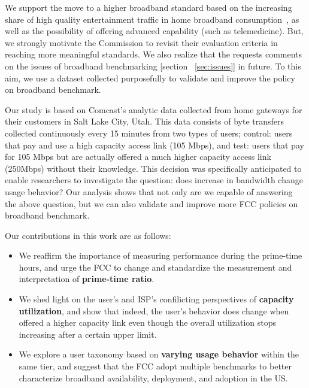 We support the move to a higher broadband standard based on the increasing 
share of high quality entertainment traffic in home broadband 
consumption~\cite{sandvine2014report1,sandvine2014report2}, as well as the 
possibility of offering advanced capability (such as telemedicine). But, we 
strongly motivate the Commission to revisit their evaluation criteria in 
reaching more meaningful standards. We also realize that the \FCC requests 
comments on the issues of broadband benchmarking [section ~\ref{sec:issues}] in 
future. To this aim, we use a dataset collected purposefully to validate and 
improve the \FCC policy on broadband benchmark.

Our study is based on Comcast’s analytic data collected from home gateways for their customers in
Salt Lake City, Utah. This data consists of byte transfers collected continuously every 15 minutes
from two types of users; control: users that pay and use a high capacity access link (105 Mbps), and
test: users that pay for 105 Mbps but are actually offered a much higher capacity access link
(250Mbps) without their knowledge. This decision was specifically anticipated to enable researchers
to investigate the question: does increase in bandwidth change usage behavior? 
Our analysis shows that not only are we capable of answering the above 
question, but we can also validate and improve more FCC policies on broadband 
benchmark.

Our contributions in this work are as follows:
\begin{itemize}
\itemsep0em
\item We reaffirm the importance of measuring performance during the 
prime-time hours, and urge the FCC to change and standardize 
the measurement and interpretation of \textbf{prime-time ratio}. 
\item We shed light on the user's and ISP's confilicting perspectives 
of \textbf{capacity utilization}, and show that indeed, the user's behavior 
does change when offered a higher capacity link even though the 
overall utilization stops increasing after a certain upper limit.
\item We explore a user taxonomy based on \textbf{varying usage behavior} 
within the same tier, and suggest that the FCC adopt multiple benchmarks 
to better characterize broadband availability, deployment, and adoption in the 
US.
\end{itemize}

